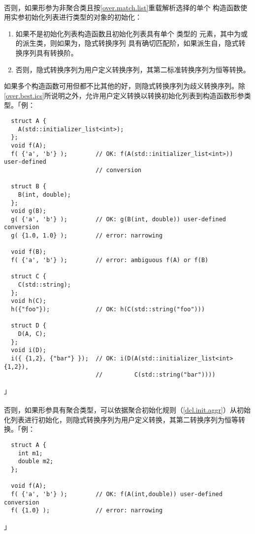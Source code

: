 \paragraph{}
否则，如果形参为非聚合类且按\ref{over.match.list}重载解析选择的单个
构造函数使用实参初始化列表进行类型的对象的初始化：
\begin{enumerate}
  \item{如果不是初始化列表构造函数且初始化列表具有单个 类型的
    元素，其中为或的派生类，则如果为，隐式转换序列
    具有确切匹配阶，如果派生自，隐式转换序列具有转换阶。}
  \item{否则，隐式转换序列为用户定义转换序列，其第二标准转换序列为恒等转换。}
\end{enumerate}
如果多个构造函数可用但都不比其他的好，则隐式转换序列为歧义转换序列。除
\ref{over.best.ics}所说明之外，允许用户定义转换以转换初始化列表到构造函数形参类
型。「例：
\begin{lstlisting}
  struct A {
    A(std::initializer_list<int>);
  };
  void f(A);
  f( {'a', 'b'} );        // OK: f(A(std::initializer_list<int>)) user-defined
                          // conversion

  struct B {
    B(int, double);
  };
  void g(B);
  g( {'a', 'b'} );        // OK: g(B(int, double)) user-defined conversion
  g( {1.0, 1.0} );        // error: narrowing

  void f(B);
  f( {'a', 'b'} );        // error: ambiguous f(A) or f(B)

  struct C {
    C(std::string);
  };
  void h(C);
  h({"foo"});             // OK: h(C(std::string("foo")))

  struct D {
    D(A, C);
  };
  void i(D);
  i({ {1,2}, {"bar"} });  // OK: i(D(A(std::initializer_list<int>{1,2}),
                          //         C(std::string("bar"))))
\end{lstlisting}」

\paragraph{}
否则，如果形参具有聚合类型，可以依据聚合初始化规则（\ref{dcl.init.aggr}）从初始
化列表进行初始化，则隐式转换序列为用户定义转换，其第二转换序列为恒等转换。「例：
\begin{lstlisting}
  struct A {
    int m1;
    double m2;
  };

  void f(A);
  f( {'a', 'b'} );        // OK: f(A(int,double)) user-defined conversion
  f( {1.0} );             // error: narrowing
\end{lstlisting}」

